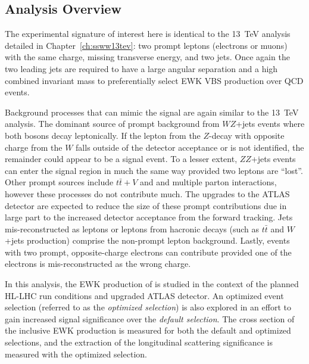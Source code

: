 \subsection{Analysis Overview}
The experimental signature of interest here is identical to the 13~TeV analysis detailed in Chapter~\ref{ch:ssww13tev}: two prompt leptons (electrons or muons) with the same charge, missing transverse energy, and two jets.
Once again the two leading jets are required to have a large angular separation and a high combined invariant mass to preferentially select EWK VBS production over QCD \ssww events.

Background processes that can mimic the signal are again similar to the 13~TeV analysis. %
The dominant source of prompt background from $WZ$+jets events where both bosons decay leptonically.  
If the lepton from the $Z$-decay with opposite charge from the $W$ falls outside of the detector acceptance or is not identified, the remainder could appear to be a \ssww signal event.
To a lesser extent, $ZZ$+jets events can enter the signal region in much the same way provided two leptons are ``lost''.
Other prompt sources include $t\bar{t}+V$ and and multiple parton interactions, however these processes do not contribute much.
The upgrades to the ATLAS detector are expected to reduce the size of these prompt contributions due in large part to the increased detector acceptance from the forward tracking.
Jets mis-reconstructed as leptons or leptons from hacronic decays (such as $t\bar{t}$ and $W$+jets production) comprise the non-prompt lepton background.
Lastly, events with two prompt, opposite-charge electrons can contribute provided one of the electrons is mis-reconstructed as the wrong charge.

In this analysis, the EWK production of \ssww is studied in the context of the planned HL-LHC run conditions and upgraded ATLAS detector.
An optimized event selection (referred to as the \emph{optimized selection}) is also explored in an effort to gain increased signal significance over the \emph{default selection}.
The cross section of the inclusive EWK production is measured for both the default and optimized selections, and the extraction of the longitudinal scattering significance is measured with the optimized selection.
